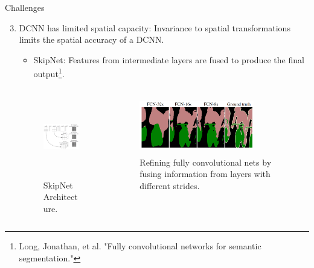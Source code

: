 \documentclass{beamer}
\begin{document}
\begin{frame}{Challenges}
\begin{enumerate}
	\setcounter{enumi}{2}
	\item {\color{blue}DCNN has limited {\color{blue}spatial capacity}}:  Invariance to spatial transformations limits the spatial accuracy of a DCNN.

	\begin{itemize}
		\item SkipNet: Features from intermediate layers are fused to produce the final output\footnote{Long, Jonathan, et al. "Fully convolutional networks for semantic segmentation."\label{note1}}.
	\end{itemize}	
	\begin{columns}
		\begin{column}{0.5\textwidth}
			\begin{figure}
				\centering
				\includegraphics[width=5cm,height=3.5cm]{figure/ss10.png}
				\captionsetup{justification=centering}
				\caption{SkipNet Architecture.}	
			\end{figure}
		\end{column}
		\begin{column}{0.5\textwidth}  %
			\begin{center}
				\begin{figure}
				\centering
				\includegraphics[width=5cm,height=2.5cm]{figure/ss27.png}
				\captionsetup{justification=centering}
				\caption{Refining fully convolutional nets by fusing information from layers with different strides.}
			\end{figure}
			\end{center}
		\end{column}
	\end{columns}
\end{enumerate}
\end{frame}
\end{document}
